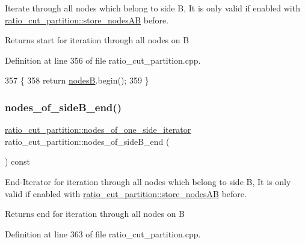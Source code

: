 Iterate through all nodes which belong to side {\ttfamily B}, It is only valid if enabled with \mbox{\hyperlink{classratio__cut__partition_af0efdeab02cb235df47e2339c196051f}{ratio\+\_\+cut\+\_\+partition\+::store\+\_\+nodes\+AB}} before.

\begin{DoxyReturn}{Returns}
start for iteration through all nodes on {\ttfamily B} 
\end{DoxyReturn}


Definition at line 356 of file ratio\+\_\+cut\+\_\+partition.\+cpp.


\begin{DoxyCode}
357 \{
358     \textcolor{keywordflow}{return} \mbox{\hyperlink{classratio__cut__partition_af207198b35e52e4055487f8ae8c23d8d}{nodesB}}.begin();
359 \}
\end{DoxyCode}
\mbox{\label{classratio__cut__partition_a838e3ab6d00155c1f3868cc920a4a8f6}} 
\subsubsection{\texorpdfstring{nodes\+\_\+of\+\_\+side\+B\+\_\+end()}{nodes\_of\_sideB\_end()}}
{\footnotesize\ttfamily \mbox{\hyperlink{classratio__cut__partition_af438a591f6559b479bf40e9ac9cfcf0e}{ratio\+\_\+cut\+\_\+partition\+::nodes\+\_\+of\+\_\+one\+\_\+side\+\_\+iterator}} ratio\+\_\+cut\+\_\+partition\+::nodes\+\_\+of\+\_\+side\+B\+\_\+end (\begin{DoxyParamCaption}{ }\end{DoxyParamCaption}) const}

End-\/\+Iterator for iteration through all nodes which belong to side {\ttfamily B}, It is only valid if enabled with \mbox{\hyperlink{classratio__cut__partition_af0efdeab02cb235df47e2339c196051f}{ratio\+\_\+cut\+\_\+partition\+::store\+\_\+nodes\+AB}} before.

\begin{DoxyReturn}{Returns}
end for iteration through all nodes on {\ttfamily B} 
\end{DoxyReturn}


Definition at line 363 of file ratio\+\_\+cut\+\_\+partition.\+cpp.


